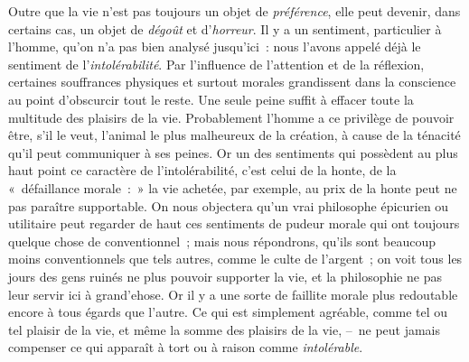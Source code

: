\documentclass[french,twoside]{book} %
\begin{document}
Outre que la vie n’est pas toujours un objet de \emph{préférence}, elle peut devenir, dans certains cas, un objet de \emph{dégoût} et d’\emph{horreur}. Il y a un sentiment, particulier à l’homme, qu’on n’a pas bien analysé jusqu’ici : nous l’avons appelé déjà le sentiment de l’\emph{intolérabilité}. Par l’influence de l’attention et de la réflexion, certaines souffrances physiques et surtout morales grandissent dans la conscience au point d’obscurcir tout le reste. Une seule peine suffit à effacer toute la multitude des plaisirs de la vie. Probablement l’homme a ce privilège de pouvoir être, s’il le veut, l’animal le plus malheureux de la création, à cause de la ténacité qu’il peut communiquer à ses peines. Or un des sentiments qui possèdent au plus haut point ce caractère de l’intolérabilité, c’est celui de la honte, de la « défaillance morale : » la vie achetée, par exemple, au prix de la honte peut ne pas paraître supportable. On nous objectera qu’un vrai philosophe épicurien ou utilitaire peut regarder de haut ces sentiments de pudeur morale qui ont toujours quelque chose de conventionnel ; mais nous répondrons, qu’ils sont beaucoup moins conventionnels que tels autres, comme le culte de l’argent ; on voit tous les jours des gens ruinés ne plus pouvoir supporter la vie, et la philosophie ne pas leur servir ici à grand’ehose. Or il y a une sorte de faillite morale plus redoutable encore à tous égards que l’autre. Ce qui est simplement agréable, comme tel ou tel plaisir de la vie, et même la somme des plaisirs de la vie, – ne peut jamais compenser ce qui apparaît à tort ou à raison comme \emph{intolérable}.\par
\end{document}
